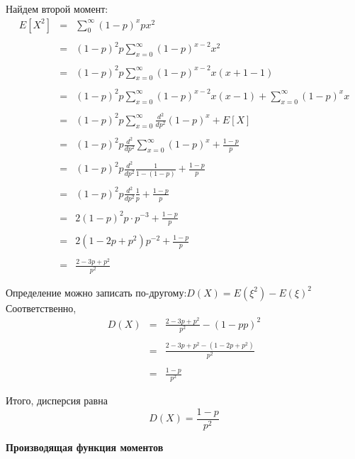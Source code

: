\documentclass[a4paper,12pt, oneside]{book}
\begin{document}
{Найдем второй момент:
$$
\begin{array}{rcl}
E[X^2] &=& \sum\limits_{0}^{\infty} (1 - p)^x px^2\\
\\
&=&(1-p)^2 p \sum\limits_{x=0}^{\infty} (1-p)^{x-2}x^2\\
\\
&=&(1-p)^2 p \sum\limits_{x=0}^{\infty} (1-p)^{x-2}x (x + 1 -1)\\
\\
&=&(1-p)^2 p \sum\limits_{x=0}^{\infty} (1-p)^{x-2}x (x -1) + \sum\limits_{x=0}^{\infty} (1-p)^{x}x \\
\\
&=&(1-p)^2 p  \sum\limits_{x=0}^{\infty} \frac{d^2}{dp^2}(1-p)^x + E[X]\\
\\
&=& (1-p)^2 p \frac{d^2}{dp^2} \sum\limits_{x=0}^{\infty} (1-p)^x + \frac{1-p}{p}\\
\\
&=&(1-p)^2 p \frac{d^2}{dp^2} \frac{1}{1-(1-p)} + \frac{1-p}{p}\\
\\
&=& (1-p)^2 p \frac{d^2}{dp^2} \frac{1}{p} + \frac{1-p}{p}\\
\\
&=& 2(1-p)^2 p\cdot p^{-3} + \frac{1-p}{p}\\
\\
&=&2(1-2p+p^2)p^{-2} + \frac{1-p}{p}\\
\\
&=&\frac{2 - 3p + p^2}{p^2}
\end{array}
$$

\vspace{\baselineskip}
Определение можно записать по-другому:$D(X) = E(\xi^2) - E(\xi)^2$\\

Соответственно,
$$
\begin{array}{rcl}
D(X) &=&\frac{2 - 3p+p^2}{p^2} - ({1-p}{p})^2\\
\\
&=&\frac{2-3p+p^2 -(1-2p + p^2)}{p^2}\\
\\
&=&\frac{1-p}{p^2}
\end{array}
$$

Итого, дисперсия равна 
$$
D(X) = \frac{1-p}{p^2}
$$



\vspace{5mm}
\large{\textbf{Производящая функция моментов}}
\vspace{5mm}

}
\end{document}
